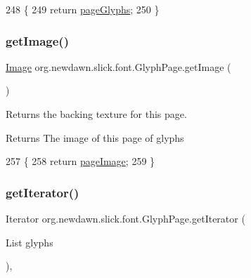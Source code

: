 \begin{DoxyCode}
248                              \{
249         \textcolor{keywordflow}{return} \mbox{\hyperlink{classorg_1_1newdawn_1_1slick_1_1font_1_1_glyph_page_a9e91d415e3d3b45f8e9ffaa687701bb4}{pageGlyphs}};
250     \}
\end{DoxyCode}
\mbox{\label{classorg_1_1newdawn_1_1slick_1_1font_1_1_glyph_page_ae2b1131c437b43c1c3e6d774d09f9ee7}} 
\subsubsection{\texorpdfstring{get\+Image()}{getImage()}}
{\footnotesize\ttfamily \mbox{\hyperlink{classorg_1_1newdawn_1_1slick_1_1_image}{Image}} org.\+newdawn.\+slick.\+font.\+Glyph\+Page.\+get\+Image (\begin{DoxyParamCaption}{ }\end{DoxyParamCaption})\hspace{0.3cm}{\ttfamily [inline]}}

Returns the backing texture for this page.

\begin{DoxyReturn}{Returns}
The image of this page of glyphs 
\end{DoxyReturn}

\begin{DoxyCode}
257                              \{
258         \textcolor{keywordflow}{return} \mbox{\hyperlink{classorg_1_1newdawn_1_1slick_1_1font_1_1_glyph_page_a9ca6f69c7df1769fe54cbd6a13f46645}{pageImage}};
259     \}
\end{DoxyCode}
\mbox{\label{classorg_1_1newdawn_1_1slick_1_1font_1_1_glyph_page_a7803412d2be72ebd03d1dee29f571770}} 
\subsubsection{\texorpdfstring{get\+Iterator()}{getIterator()}}
{\footnotesize\ttfamily Iterator org.\+newdawn.\+slick.\+font.\+Glyph\+Page.\+get\+Iterator (\begin{DoxyParamCaption}\item[{List}]{glyphs }\end{DoxyParamCaption})\hspace{0.3cm}{\ttfamily [inline]}, {\ttfamily [private]}}

